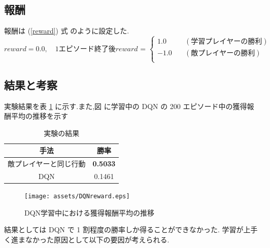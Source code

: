 \documentclass{jarticle}     %
\begin{document}
\subsection{報酬}
報酬は (\ref{reward}) 式 のように設定した.
\begin{equation}
  \label{reward}
  reward = 0.0,
  \quad 
  \mathrm{1 エピソード終了後}
  reward \text{ = }
  \left\{
    \begin{aligned}
        1.0 \quad & (学習プレイヤーの勝利) \\
        -1.0 \quad & (敵プレイヤーの勝利) \\
    \end{aligned}
    \right.
\end{equation}


\subsection{結果と考察}
実験結果を表 \ref{table:jikken} に示す.また,図 に学習中の DQN の 200 エピソード中の獲得報酬平均の推移を示す
\begin{table}[H]
  \centering
  \caption{実験の結果}
  \label{table:jikken}
  \begin{tabular}{|c|c|}
  \hline
  手法 & 勝率     \\ \hline
  敵プレイヤーと同じ行動      & \textbf{0.5033}  \\ \hline
  DQN      & 0.1461 \\ \hline
  \end{tabular}
  \end{table}

  \begin{figure}[H]
    \centering
    \texttt{[image: assets/DQNreward.eps]}
    \caption{DQN学習中における獲得報酬平均の推移}
    \label{fig:DQN}
  \end{figure}

結果としては DQN で 1 割程度の勝率しか得ることができなかった.
学習が上手く進まなかった原因として以下の要因が考えられる.
\end{document}
